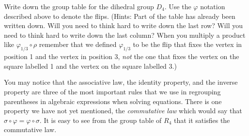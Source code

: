 \iteme Write down the group table for the dihedral group $D_4$.  Use the
$\varphi$ notation described above to denote the flips.  (Hints:  Part of the
table has already been written down.  Will you need to think hard to write
down the last row?  Will you need to think hard to write down the last
column?\label{dihedral3}  When you multiply a product like $\varphi_{1/3}
\circ \rho$ remember that we defined $\varphi_{1/3}$ to be the flip that
fixes the vertex in position 1 and the vertex in position 3, {\em not} the
one that fixes the vertex on the square labelled 1 and the vertex on the
square labelled 3.)
\ep

You may notice that the associative law, the identity property, and the
inverse property are three of the most important rules that we use in
regrouping parentheses in algebraic expressions when solving equations. 
There is one property we have not yet mentioned, the {\em commutative
law} which would say that $\sigma\circ \varphi =
\varphi\circ\sigma$.  It is easy to see from the group table of $R_4$ that it
satisfies the commutative law.

